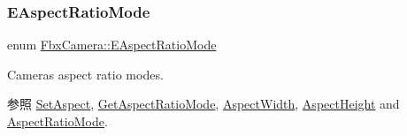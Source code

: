 \mbox{\label{class_fbx_camera_a2135478bb5fd6985835c14b11e1fccda}} 
\subsubsection{\texorpdfstring{E\+Aspect\+Ratio\+Mode}{EAspectRatioMode}}
{\footnotesize\ttfamily enum \hyperlink{class_fbx_camera_a2135478bb5fd6985835c14b11e1fccda}{Fbx\+Camera\+::\+E\+Aspect\+Ratio\+Mode}}

Camera\textquotesingle{}s aspect ratio modes. \begin{DoxySeeAlso}{参照}
\hyperlink{class_fbx_camera_adb9cf67e4b59463add6a052003797392}{Set\+Aspect}, \hyperlink{class_fbx_camera_ad60e1323bdb9f349dbb96e5d8bdf716a}{Get\+Aspect\+Ratio\+Mode}, \hyperlink{class_fbx_camera_ada3746eb834815c224eb5fc223fa35ac}{Aspect\+Width}, \hyperlink{class_fbx_camera_aabeade4a36213c65d7a4f45aeceebff6}{Aspect\+Height} and \hyperlink{class_fbx_camera_ad140535acab4a663a6f4cb51ef603e7a}{Aspect\+Ratio\+Mode}. 
\end{DoxySeeAlso}
